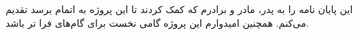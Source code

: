 \begin{acknowledgementpage}

\vspace{1.5cm}

{\nastaliq
{
این پایان نامه را به پدر، مادر و برادرم که کمک کردند تا این پروژه به اتمام برسد تقدیم می‌کنم. 
همچنین امیدوارم این پروژه گامی نخست برای گام‌های فرا تر باشد.



}}\end{acknowledgementpage}
\newpage
